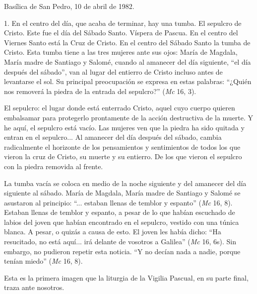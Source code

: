 			\begin{referencia}Basílica de San Pedro, 10 de abril de 1982.\end{referencia}
			
			\begin{body} 1. En el centro del día, que acaba de terminar, hay una tumba. El sepulcro de Cristo. Este fue el día del Sábado Santo. Víspera de Pascua. En el centro del Viernes Santo está la Cruz de Cristo. En el centro del Sábado Santo la tumba de Cristo. Esta tumba tiene a las tres mujeres ante sus ojos: María de Magdala, María madre de Santiago y Salomé, cuando al amanecer del día siguiente, “el día después del sábado”, van al lugar del entierro de Cristo incluso antes de levantarse el sol. Su principal preocupación se expresa en estas palabras: “¿Quién nos removerá la piedra de la entrada del sepulcro?” (\textit{Mc} 16, 3). \end{body}
			
			\begin{body}El sepulcro: el lugar donde está enterrado Cristo, aquel cuyo cuerpo quieren embalsamar para protegerlo prontamente de la acción destructiva de la muerte. Y he aquí, el sepulcro está vacío. Las mujeres ven que la piedra ha sido quitada y entran en el sepulcro... Al amanecer del día después del sábado, cambia radicalmente el horizonte de los pensamientos y sentimientos de todos los que vieron la cruz de Cristo, su muerte y su entierro. De los que vieron el sepulcro con la piedra removida al frente. \end{body}
			
			\begin{body}La tumba vacía se coloca en medio de la noche siguiente y del amanecer del día siguiente al sábado. María de Magdala, María madre de Santiago y Salomé se asustaron al principio: “... estaban llenas de temblor y espanto” (\textit{Mc }16, 8). Estaban llenas de temblor y espanto, a pesar de lo que habían escuchado de labios del joven que habían encontrado en el sepulcro, vestido con una túnica blanca. A pesar, o quizás a causa de esto. El joven les había dicho: “Ha resucitado, no está aquí... irá delante de vosotros a Galilea” (\textit{Mc} 16, 6s). Sin embargo, no pudieron repetir esta noticia. “Y no decían nada a nadie, porque tenían miedo” (\textit{Mc }16, 8).\end{body}
			
			\begin{body}Esta es la primera imagen que la liturgia de la Vigilia Pascual, en su parte final, traza ante nosotros. \end{body}
			
